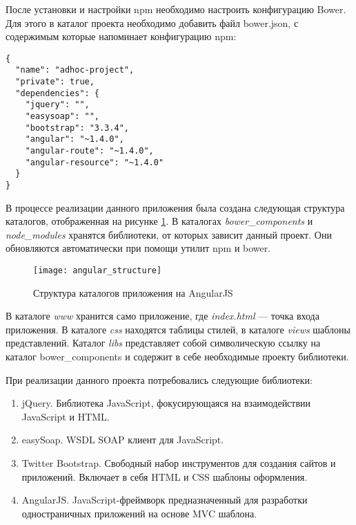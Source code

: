 После установки и настройки npm необходимо настроить конфигурацию Bower. Для этого в каталог проекта необходимо добавить файл bower.json, с содержимым которые напоминает конфигурацию npm:
\begin{lstlisting}
{
  "name": "adhoc-project",
  "private": true,
  "dependencies": {
    "jquery": "",
    "easysoap": "",
    "bootstrap": "3.3.4",
    "angular": "~1.4.0",
    "angular-route": "~1.4.0",
    "angular-resource": "~1.4.0"
  }
}
\end{lstlisting}

% 
В процессе реализации данного приложения была создана следующая структура каталогов, отображенная на рисунке \ref{angular_structure}. В каталогах \textit{bower\_components} и \textit{node\_modules} хранятся библиотеки, от которых зависит данный проект. Они обновляются автоматически при помощи утилит npm и bower.
\begin{figure}[h]
\center\texttt{[image: angular\_structure]}
\caption{Структура каталогов приложения на AngularJS}\label{angular_structure}
\end{figure}

В каталоге \textit{www} хранится само приложение, где \textit{index.html} --- точка входа приложения. В каталоге \textit{css} находятся таблицы стилей, в каталоге \textit{views} шаблоны представлений. Каталог \textit{libs} представляет собой символическую ссылку на каталог bower\_components и содержит в себе необходимые проекту библиотеки.

При реализации данного проекта потребовались следующие библиотеки:
\begin{enumerate}
 \item jQuery. Библиотека JavaScript, фокусирующаяся на взаимодействии JavaScript и HTML\cite{jquery}.
 \item easySoap. WSDL SOAP клиент для JavaScript.
 \item Twitter Bootstrap. Свободный набор инструментов для создания сайтов и приложений. Включает в себя HTML и CSS шаблоны оформления\cite{bootstrap}.
 \item AngularJS. JavaScript-фреймворк предназначенный для разработки одностраничных приложений на основе MVC шаблона\cite{angular}.
\end{enumerate}

